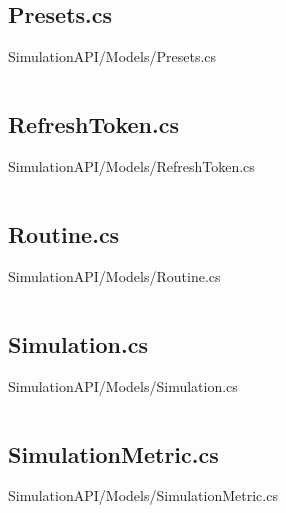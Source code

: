 \inputminted[linenos,breaklines,tabsize=2]{csharp}{/Users/Henry/Desktop/NEAComputerScience/SimulationAPI/Models/Path.cs}

\makeatletter
\subsection*{Presets.cs}
SimulationAPI/Models/Presets.cs
\def\@currentlabelname{Presets.cs}
\label{code:SimulationAPI:Models:Presets.cs}
\makeatother

\inputminted[linenos,breaklines,tabsize=2]{csharp}{/Users/Henry/Desktop/NEAComputerScience/SimulationAPI/Models/Presets.cs}

\makeatletter
\subsection*{RefreshToken.cs}
SimulationAPI/Models/RefreshToken.cs
\def\@currentlabelname{RefreshToken.cs}
\label{code:SimulationAPI:Models:RefreshToken.cs}
\makeatother

\inputminted[linenos,breaklines,tabsize=2]{csharp}{/Users/Henry/Desktop/NEAComputerScience/SimulationAPI/Models/RefreshToken.cs}

\makeatletter
\subsection*{Routine.cs}
SimulationAPI/Models/Routine.cs
\def\@currentlabelname{Routine.cs}
\label{code:SimulationAPI:Models:Routine.cs}
\makeatother

\inputminted[linenos,breaklines,tabsize=2]{csharp}{/Users/Henry/Desktop/NEAComputerScience/SimulationAPI/Models/Routine.cs}

\makeatletter
\subsection*{Simulation.cs}
SimulationAPI/Models/Simulation.cs
\def\@currentlabelname{Simulation.cs}
\label{code:SimulationAPI:Models:Simulation.cs}
\makeatother

\inputminted[linenos,breaklines,tabsize=2]{csharp}{/Users/Henry/Desktop/NEAComputerScience/SimulationAPI/Models/Simulation.cs}

\makeatletter
\subsection*{SimulationMetric.cs}
SimulationAPI/Models/SimulationMetric.cs
\def\@currentlabelname{SimulationMetric.cs}
\label{code:SimulationAPI:Models:SimulationMetric.cs}
\makeatother


